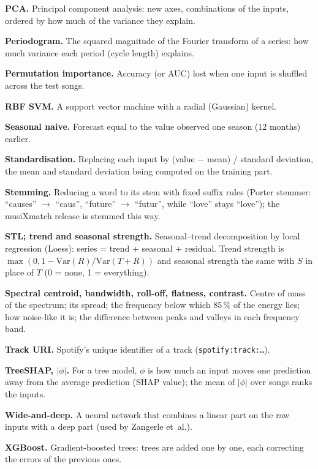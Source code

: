 {\noindent\textbf{PCA.} Principal component analysis: new axes, combinations of the inputs, ordered by how much of the variance
they explain.\par
\noindent\textbf{Periodogram.} The squared magnitude of the Fourier transform of a series: how much variance each period
(cycle length) explains.\par
\noindent\textbf{Permutation importance.} Accuracy (or AUC) lost when one input is shuffled across the test songs.\par
\noindent\textbf{RBF SVM.} A support vector machine with a radial (Gaussian) kernel.\par
\noindent\textbf{Seasonal naive.} Forecast equal to the value observed one season (12 months) earlier.\par
\noindent\textbf{Standardisation.} Replacing each input by (value $-$ mean) / standard deviation, the mean and standard
deviation being computed on the training part.\par
\noindent\textbf{Stemming.} Reducing a word to its stem with fixed suffix rules (Porter stemmer: ``causes'' $\to$ ``caus'',
``future'' $\to$ ``futur'', while ``love'' stays ``love''); the musiXmatch release is stemmed this way.\par
\noindent\textbf{STL; trend and seasonal strength.} Seasonal--trend decomposition by local regression (Loess): series = trend
+ seasonal + residual. Trend strength is $\max(0,1-\mathrm{Var}(R)/\mathrm{Var}(T+R))$ and seasonal strength the same
with $S$ in place of $T$ (0 = none, 1 = everything).\par
\noindent\textbf{Spectral centroid, bandwidth, roll-off, flatness, contrast.} Centre of mass of the spectrum; its spread; the
frequency below which 85\,\% of the energy lies; how noise-like it is; the difference between peaks and valleys
in each frequency band.\par
\noindent\textbf{Track URI.} Spotify's unique identifier of a track (\texttt{spotify:track:\dots}).\par
\noindent\textbf{TreeSHAP, $|\phi|$.} For a tree model, $\phi$ is how much an input moves one prediction away from the average
prediction (SHAP value); the mean of $|\phi|$ over songs ranks the inputs.\par
\noindent\textbf{Wide-and-deep.} A neural network that combines a linear part on the raw inputs with a deep part (used by
Zangerle et~al.).\par
\noindent\textbf{XGBoost.} Gradient-boosted trees: trees are added one by one, each correcting the errors of the previous ones.\par
}

